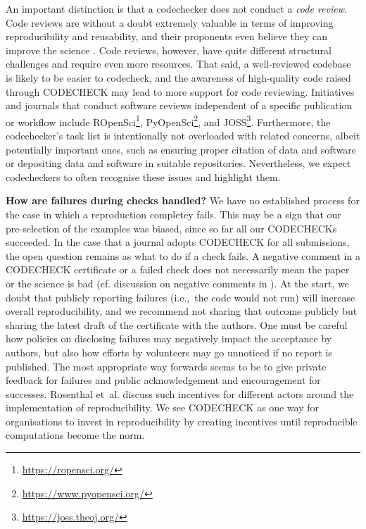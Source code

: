 \documentclass[12pt]{article}
\begin{document}
An important distinction is that a codechecker does not conduct a 
\emph{code review}. Code reviews are without a doubt extremely valuable in 
terms of improving reproducibility and reusability, and their proponents 
even believe they can improve the science \cite{petre_code_2014}.
Code reviews, however, have quite different structural challenges and 
require even more resources. That said, a well-reviewed codebase is likely
to be easier to codecheck, and the awareness of high-quality code raised
through CODECHECK may lead to more support for code reviewing.
Initiatives and journals that conduct software reviews independent of 
a specific publication or workflow include
ROpenSci\footnote{\url{https://ropensci.org/}},
PyOpenSci\footnote{\url{https://www.pyopensci.org/}},
and JOSS\footnote{\url{https://joss.theoj.org/}}.
Furthermore, the codechecker's task list is intentionally not
overloaded with related concerns, albeit potentially important ones,
such as ensuring proper citation of data and software or depositing
data and software in suitable repositories. Nevertheless,
we expect codecheckers to often recognise these issues and highlight them.

\textbf{How are failures during checks handled?}
We have no established process for the case
in which a reproduction completey fails.
This may be a sign that our pre-selection of the examples was biased, since so far all our CODECHECKs succeeded.
In the case that a journal adopts CODECHECK for all submissions, the open 
question remains as what to do if a check fails.
A negative comment in a CODECHECK certificate or a failed check does
not necessarily mean the paper or the science is bad
(cf. discussion on negative comments in \cite{everythinghertz123}).
At the start, we doubt that publicly reporting failures (i.e.,~the code 
would not run) will increase overall reproducibility, and we recommend not
sharing that outcome publicly but sharing the latest draft of the 
certificate with the authors.
One must be careful how policies on disclosing failures may negatively impact the acceptance by authors, but also how efforts by volunteers may go unnoticed if no report is published.
The most appropriate way forwards seems to be to give private feedback for failures and public acknowledgement and encouragement for successes.
Rosenthal et~al. \cite{Rosenthal2016b} discuss such incentives for different actors around the
implementation of reproducibility. We see CODECHECK as one way for
organisations to invest in reproducibility by creating incentives
until reproducible computations become the norm.
\end{document}
